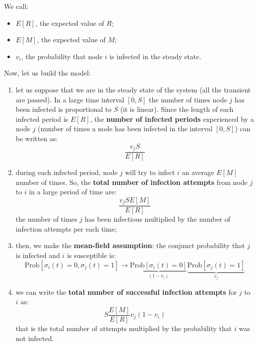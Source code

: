 \documentclass[../main/main.tex]{subfiles}
\begin{document}
We call:
\begin{itemize}
\item \( E[R] \), the expected value of \( R \);
\item \( E[M] \), the expected value of \( M \);
\item \( v_i \), the probability that node \( i \) is infected in the steady state.
\end{itemize}



Now, let us build the model:
\begin{enumerate}
\item let us suppose that we are in the steady state of the system (all the transient are passed).
In a large time interval \( [0,S] \) the number of times node \( j \) has been infected is proportional to \( S \) (it is linear).
Since the length of each infected period is \( E[R] \), the \textbf{number of infected periods} experienced by a node \( j \) (number of times a node has been infected in the interval \( [0,S] \)) can be written as:
\begin{equation*}
  \frac{v_j S}{E[R]}
\end{equation*}

\item during each infected period, node \( j \) will try to infect \( i \) an average \( E[M] \) number of times. So, the \textbf{total number of infection attempts} from node \( j \) to \( i \) in a large period of time are:
\begin{equation*}
  \frac{v_j S E[M]}{E[R]}
\end{equation*}
the number of times \( j \) has been infectious multiplied by the number of infection attempts per each time;

\item then, we make the \textbf{mean-field assumption}: the  conjunct probability that $j$ is infected and $i$ is susceptible is:
\begin{equation*}
  \text{Prob} [ \sigma _i (t)=0, \sigma _j (t)=1] \rightarrow \underbrace{\text{Prob} [\sigma _i (t) = 0]}_{(1-v_i)} \underbrace{\text{Prob} [\sigma _j (t) = 1]}_{v_j}
\end{equation*}

\item we can write the \textbf{total number of successful infection attempts} for \( j \) to \( i \) as:
\begin{equation*}
  S \frac{E[M]}{E[R] } v_j (1-v_i)
\end{equation*}
that is the total number of attempts multiplied by the probability that $i$ was not infected.


\end{enumerate}
\end{document}
